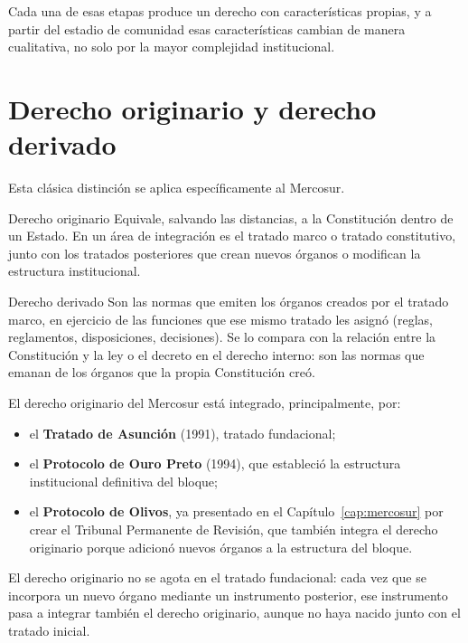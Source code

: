 \documentclass[12pt,oneside]{book}
\begin{document}
Cada una de esas etapas produce un derecho con características propias, y a partir del estadio de comunidad esas características cambian de manera cualitativa, no solo por la mayor complejidad institucional.

\section{Derecho originario y derecho derivado}

Esta clásica distinción se aplica específicamente al Mercosur.

\begin{definition}{Derecho originario}
Equivale, salvando las distancias, a la Constitución dentro de un Estado. En un área de integración es el tratado marco o tratado constitutivo, junto con los tratados posteriores que crean nuevos órganos o modifican la estructura institucional.
\end{definition}

\begin{definition}{Derecho derivado}
Son las normas que emiten los órganos creados por el tratado marco, en ejercicio de las funciones que ese mismo tratado les asignó (reglas, reglamentos, disposiciones, decisiones). Se lo compara con la relación entre la Constitución y la ley o el decreto en el derecho interno: son las normas que emanan de los órganos que la propia Constitución creó.
\end{definition}

El derecho originario del Mercosur está integrado, principalmente, por:

\begin{itemize}
    \item el \textbf{Tratado de Asunción} (1991), tratado fundacional;
    \item el \textbf{Protocolo de Ouro Preto} (1994), que estableció la estructura institucional definitiva del bloque;
    \item el \textbf{Protocolo de Olivos}, ya presentado en el Capítulo~\ref{cap:mercosur} por crear el Tribunal Permanente de Revisión, que también integra el derecho originario porque adicionó nuevos órganos a la estructura del bloque.
\end{itemize}

El derecho originario no se agota en el tratado fundacional: cada vez que se incorpora un nuevo órgano mediante un instrumento posterior, ese instrumento pasa a integrar también el derecho originario, aunque no haya nacido junto con el tratado inicial.
\end{document}
